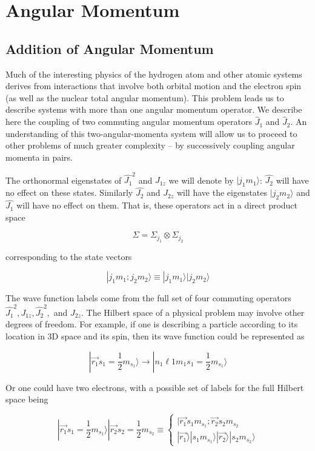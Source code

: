 \section{Angular Momentum}
\subsection{Addition of Angular Momentum}

Much of the interesting physics of the hydrogen atom and other atomic systems
derives from interactions that involve both orbital motion and the electron
spin (as well as the nuclear total angular momentum). This problem leads us to
describe systems with more than one angular momentum operator. We describe here
the coupling of two commuting angular momentum operators $\hat{J}_1$ and
$\hat{J}_2$. An understanding of this two-angular-momenta system will allow us
to proceed to other problems of much greater complexity -- by successively
coupling angular momenta in pairs. 

The orthonormal eigenstates of $\hat{J_1}^2$ and $J_{1z}$ we will denote by
$|j_1m_1\rangle$: $\hat{J_2}$ will have no effect on these states. Similarly
$\hat{J_2}$ and $J_{2z}$ will have the eigenstates $|j_2m_2\rangle$ and
$\hat{J_1}$ will have no effect on them. That is, these operators act in
a direct product space 

\[
  \Sigma = \Sigma_{j_1} \otimes \Sigma_{j_2}
\] \vspace{3px}

corresponding to the state vectors 

\[
|j_1m_1; j_2m_2 \rangle \equiv |j_1m_1\rangle |j_2m_2\rangle
\] \vspace{3px}

The wave function labels come from the full set of four commuting operators
$\hat{J_1}^2, J_{1z}, \hat{J_2}^2,$ and $J_{2z}$. The Hilbert space of
a physical problem may involve other degrees of freedom. For example, if one is
describing a particle according to its location in 3D space and its spin, then
its wave function could be represented as 

\[
  | \vec{r_1} s_1 = \frac{1}{2}m_{s_1} \rangle \rightarrow |n_1\ell 1 m_1 s_1
  = \frac{1}{2} m_{s_1} \rangle 
\] \vspace{3px}

Or one could have two electrons, with a possible set of labels for the full
Hilbert space being 

\[
  | \vec{r_1} s_1 = \frac{1}{2} m_{s_1} \rangle | \vec{r_2} s_2
  = \frac{1}{2}m_{s_2} \equiv \begin{cases}
    |\vec{r_1}s_1m_{s_1}; \vec{r_2}s_2m_{s_2} \\ |\vec{r_1}\rangle |
    s_1m_{s_1}\rangle |\vec{r_2}\rangle |s_2m_{s_2}\rangle
  \end{cases} 
\] \vspace{3px}


